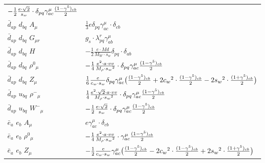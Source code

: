\begin{center}
\begin{tabular}{|l|l|}
	$-\frac{1}{2}\frac{ e \cdot\sqrt{2}}{ s_w}\cdot \delta_{p q} \gamma_{a c}^\mu {(1-\gamma^5)_{c b}\over 2} $\\[2mm]
$\bar{d}{}_{a p }$ \phantom{-} $d{}_{b q }$ \phantom{-} ${A}_{\mu }$ \phantom{-}  &
	$\frac{1}{3} e\delta_{p q} \gamma_{a c}^\mu \cdot \delta_{c b} $\\[2mm]
$\bar{d}{}_{a p }$ \phantom{-} $d{}_{b q }$ \phantom{-} ${G}_{\mu r }$ \phantom{-}  &
	$ g_s\cdot \lambda_{p q}^r \gamma_{a b}^\mu $\\[2mm]
$\bar{d}{}_{a p }$ \phantom{-} $d{}_{b q }$ \phantom{-} ${H}_{}$ \phantom{-}  &
	$-\frac{1}{2}\frac{ e \cdot Md}{ M_W \cdot s_w}\delta_{p q} \cdot \delta_{a b} $\\[2mm]
$\bar{d}{}_{a p }$ \phantom{-} $d{}_{b q }$ \phantom{-} $\rho^0{}_{\mu }$ \phantom{-}  &
	$-\frac{1}{4}\frac{ e{}^2  \cdot a \cdot vv}{ M_{\rho} \cdot s_w{}^2 }\cdot \delta_{p q} \gamma_{a c}^\mu {(1-\gamma^5)_{c b}\over 2} $\\[2mm]
$\bar{d}{}_{a p }$ \phantom{-} $d{}_{b q }$ \phantom{-} ${Z}_{\mu }$ \phantom{-}  &
	$\frac{1}{6}\frac{ e}{ c_w \cdot s_w}\delta_{p q} \gamma_{a c}^\mu \big({(1-\gamma^5)_{c b}\over 2} +2 c_w{}^2 \cdot {(1-\gamma^5)_{c b}\over 2} -2 s_w{}^2 \cdot {(1+\gamma^5)_{c b}\over 2} \big)$\\[2mm]
$\bar{d}{}_{a p }$ \phantom{-} $u{}_{b q }$ \phantom{-} $\rho^-{}_{\mu }$ \phantom{-}  &
	$\frac{1}{4}\frac{ e{}^2  \cdot\sqrt{2} \cdot a \cdot vv}{ M_{\rho} \cdot s_w{}^2 }\cdot \delta_{p q} \gamma_{a c}^\mu {(1-\gamma^5)_{c b}\over 2} $\\[2mm]
$\bar{d}{}_{a p }$ \phantom{-} $u{}_{b q }$ \phantom{-} $W^-{}_{\mu }$ \phantom{-}  &
	$-\frac{1}{2}\frac{ e \cdot\sqrt{2}}{ s_w}\cdot \delta_{p q} \gamma_{a c}^\mu {(1-\gamma^5)_{c b}\over 2} $\\[2mm]
$\bar{e}{}_{a }$ \phantom{-} $e{}_{b }$ \phantom{-} ${A}_{\mu }$ \phantom{-}  &
	$ e\gamma_{a c}^\mu \cdot \delta_{c b} $\\[2mm]
$\bar{e}{}_{a }$ \phantom{-} $e{}_{b }$ \phantom{-} $\rho^0{}_{\mu }$ \phantom{-}  &
	$-\frac{1}{4}\frac{ e{}^2  \cdot a \cdot vv}{ M_{\rho} \cdot s_w{}^2 }\cdot \gamma_{a c}^\mu {(1-\gamma^5)_{c b}\over 2} $\\[2mm]
$\bar{e}{}_{a }$ \phantom{-} $e{}_{b }$ \phantom{-} ${Z}_{\mu }$ \phantom{-}  &
	$-\frac{1}{2}\frac{ e}{ c_w \cdot s_w}\gamma_{a c}^\mu \big({(1-\gamma^5)_{c b}\over 2} -2 c_w{}^2 \cdot {(1-\gamma^5)_{c b}\over 2} +2 s_w{}^2 \cdot {(1+\gamma^5)_{c b}\over 2} \big)$\\[2mm]

\end{tabular}
\end{center}
